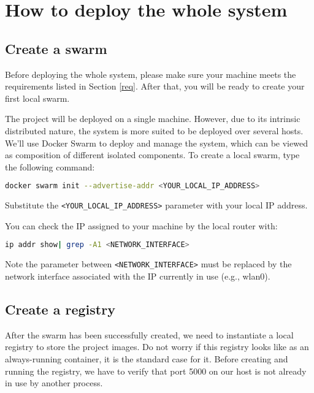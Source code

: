 \section{How to deploy the whole system}\label{sec:sys}

\subsection{Create a swarm}\label{sec:sys-swarm}

Before deploying the whole system, please make sure your machine meets the
requirements listed in Section \ref{req}.
After that, you will be ready to create your first local swarm.


The project will be deployed on a single machine. However, due to its intrinsic
distributed nature, the system is more suited to be deployed over several hosts.
\\

We'll use Docker Swarm to deploy and manage the system, which can be
viewed as composition of different isolated components.
To create a local swarm, type the following command:

\begin{lstlisting}[language=bash]
docker swarm init --advertise-addr <YOUR_LOCAL_IP_ADDRESS>
\end{lstlisting}

Substitute the \texttt{<YOUR\_LOCAL\_IP\_ADDRESS>} parameter with your local
IP address.

You can check the IP assigned to your machine by the local router with:

\begin{lstlisting}[language=bash]
ip addr show| grep -A1 <NETWORK_INTERFACE>
\end{lstlisting}

Note the parameter between \texttt{<NETWORK\_INTERFACE>} must
be replaced by the network interface associated with the IP currently in use
(e.g., wlan0).



\subsection{Create a registry}

After the swarm has been successfully created, we need to instantiate a local
registry to store the project images. Do not worry if this registry looks like
as an always-running container, it is the standard case for it.
Before creating and running the registry, we have to verify that port 5000
on our host is not already in use by another process.

